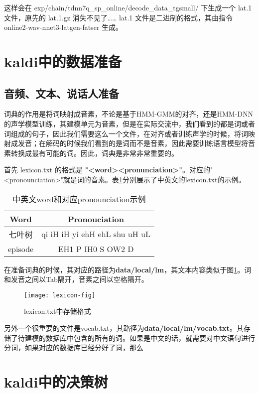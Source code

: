 这样会在 exp/chain/tdnn7q\_sp\_online/decode\_data\_tgsmall/ 下生成一个 lat.1 文件，原先的 lat.1.gz 消失不见了…… lat.1 文件是二进制的格式，其由指令 online2-wav-nnet3-latgen-fatser 生成。

\section{kaldi中的数据准备}
\subsection{音频、文本、说话人准备}

词典的作用是将词映射成音素，不论是基于HMM-GMM的对齐，还是HMM-DNN的声学模型训练，其建模单元为音素，但是在实际交流中，我们看到的都是词或者词组成的句子，因此我们需要这么一个文件，在对齐或者训练声学的时候，将词映射成发音；在解码的时候我们看到的是词而不是音素，因此需要训练语言模型将音素转换成最有可能的词。因此，词典是非常非常重要的。

首先 lexicon.txt 的格式是 {\bf "<word>\qquad<pronunciation>"}。对应的"<pronounciation>"就是词的音素。表\ref{tab:lexicon-format}分别展示了中英文的lexicon.txt的示例。
\begin{table}[h]
\centering
\caption{中英文word和对应pronounciation示例}
   \begin{tabular*}{1\textwidth}{@{\extracolsep{\fill}}cc}
   \toprule
    {\bf Word} & {\bf Pronouciation} \\
   \midrule
   七叶树   & qi iH iH yi ehH ehL shu uH uL \\
   episode & EH1 P IH0 S OW2 D  \\
   \bottomrule
   \end{tabular*}
 \label{tab:lexicon-format}
\end{table}

在准备词典的时候，其对应的路径为{\bf data/local/lm}，其文本内容类似于图\ref{fig:lexicon-fig}。词和发音之间以Tab隔开，音素之间以空格隔开。
\begin{figure}[!ht]
  \centering
  \texttt{[image: lexicon-fig]}
  \caption{lexicon.txt中存储格式}
\label{fig:lexicon-fig}
\end{figure}

另外一个很重要的文件是vocab.txt，其路径为{\bf data/local/lm/vocab.txt}。其存储了待建模的数据库中包含的所有的词。如果是中文的话，就需要对中文语句进行分词，如果对应的数据库已经分好了词，那么


\section{kaldi中的决策树}
\label{sec:kaldi-dt}